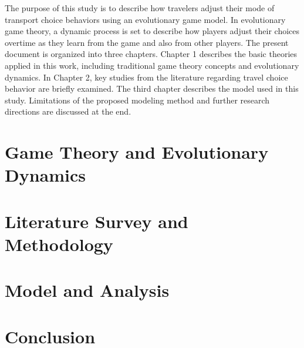 \documentclass[12pt]{report}
\begin{document}
The purpose of this study is to describe how travelers adjust their mode of transport choice behaviors using an evolutionary game model. In evolutionary game theory, a dynamic process is set to describe how players adjust their choices overtime as they learn from the game and also from other players. The present document is organized into three chapters. Chapter 1 describes the basic theories applied in this work, including traditional game theory concepts and evolutionary dynamics. In Chapter 2, key studies from the literature regarding travel choice behavior are briefly examined. The third chapter describes the model used in this study. Limitations of the proposed modeling method and further research directions are discussed at the end. 

\fancyhf{}
\rhead{\thesection}
\lhead{\leftmark}
\fancyfoot[LE,RO]{\thepage}
\renewcommand{\headrulewidth}{2pt}
\renewcommand{\footrulewidth}{1pt}

\chapter{Game Theory and Evolutionary Dynamics}


\chapter{Literature Survey and Methodology} 


\chapter{Model and Analysis}


\chapter*{Conclusion}

\end{document}

